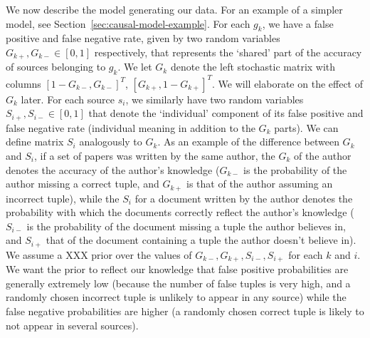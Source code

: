 \documentclass{sig-alternate}
\newcounter{prob}
\begin{document}
We now describe the model generating our data. For an example of a simpler model, see Section~\ref{sec:causal-model-example}. For each $g_k$, we have a false positive and false negative rate, given by two random variables $G_{k+},G_{k-} \in [0,1]$ respectively, that represents the `shared' part of the accuracy of sources belonging to $g_k$. We let $G_k$ denote the left stochastic matrix with columns $[1-G_{k-},G_{k-}]^T$, $[G_{k+},1-G_{k+}]^T$. We will elaborate on the effect of $G_k$ later. For each source $s_i$, we similarly have two random variables $S_{i+},S_{i-} \in [0,1]$ that denote the `individual' component of its false positive and false negative rate (individual meaning in addition to the $G_k$ parts). We can define matrix $S_i$ analogously to $G_k$. As an example of the difference between $G_k$ and $S_i$, if a set of papers was written by the same author, the $G_k$ of the author denotes the accuracy of the author's knowledge ($G_{k-}$ is the probability of the author missing a correct tuple, and $G_{k+}$ is that of the author assuming an incorrect tuple), while the $S_i$ for a document written by the author denotes the probability with which the documents correctly reflect the author's knowledge ($S_{i-}$ is the probability of the document missing a tuple the author believes in, and $S_{i+}$ that of the document containing a tuple the author doesn't believe in). We assume a XXX prior over the values of $G_{k-}, G_{k+}, S_{i-}, S_{i+}$ for each $k$ and $i$. We want the prior to reflect our knowledge that false positive probabilities are generally extremely low (because the number of false tuples is very high, and a randomly chosen incorrect tuple is unlikely to appear in any source) while the false negative probabilities are higher (a randomly chosen correct tuple is likely to not appear in several sources).
\end{document}
